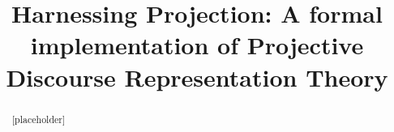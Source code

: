 \documentclass[a4paper,10pt,twoside]{article}
\begin{document}
\title{Harnessing Projection: A formal implementation of 
  Projective Discourse Representation Theory}


\maketitle
\thispagestyle{empty}

\begin{abstract} 
  [placeholder]
\end{abstract}

\tableofcontents %













\clearpage %


\end{document}
